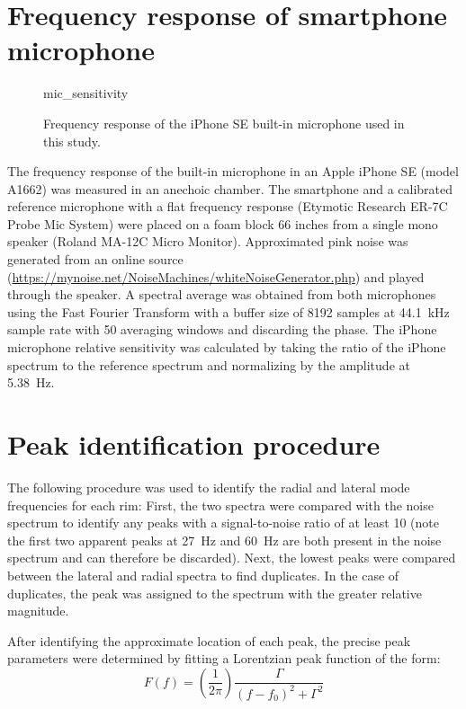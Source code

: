 \documentclass[../../thesis.tex]{subfiles}
\begin{document}
\section{Frequency response of smartphone microphone}
\label{app:mic_cal}

\begin{figure}[h]
\centering
{mic_sensitivity}
\caption[Frequency response of the iPhone SE microphone]{Frequency response of the iPhone SE built-in microphone used in this study.}
\label{fig:mic_sensitivity}
\end{figure}

The frequency response of the built-in microphone in an Apple iPhone SE (model A1662) was measured in an anechoic chamber. The smartphone and a calibrated reference microphone with a flat frequency response (Etymotic Research ER-7C Probe Mic System) were placed on a foam block 66 inches from a single mono speaker (Roland MA-12C Micro Monitor). Approximated pink noise was generated from an online source (\url{https://mynoise.net/NoiseMachines/whiteNoiseGenerator.php}) and played through the speaker. A spectral average was obtained from both microphones using the Fast Fourier Transform with a buffer size of 8192 samples at \SI{44.1}{kHz} sample rate with 50 averaging windows and discarding the phase. The iPhone microphone relative sensitivity was calculated by taking the ratio of the iPhone spectrum to the reference spectrum and normalizing by the amplitude at \SI{5.38}{Hz}.

\section{Peak identification procedure}
\label{app:peak_fits}

The following procedure was used to identify the radial and lateral mode frequencies for each rim: First, the two spectra were compared with the noise spectrum to identify any peaks with a signal-to-noise ratio of at least 10 (note the first two apparent peaks at \SI{27}{Hz} and \SI{60}{Hz} are both present in the noise spectrum and can therefore be discarded). Next, the lowest peaks were compared between the lateral and radial spectra to find duplicates. In the case of duplicates, the peak was assigned to the spectrum with the greater relative magnitude.

After identifying the approximate location of each peak, the precise peak parameters were determined by fitting a Lorentzian peak function of the form:
\begin{equation}
\label{eq:ema_peak_fit}
F(f) = \left(\frac{1}{2\pi}\right) \frac{\Gamma}{(f-f_0)^2 + \Gamma^2}
\end{equation}
\end{document}
